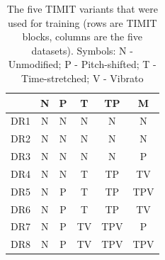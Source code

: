 \begin{table}
 \begin{center}
  \begin{tabular}{|c||c|c|c|c|c|}
  \hline
   & \textbf{N} & \textbf{P} &\textbf{T} &\textbf{TP} &\textbf{M} \\
  \hline
  DR1 & N & N & N & N & N  \\
  DR2 & N & N & N & N & N \\
  DR3 & N & N & N & N & P\\
  DR4 & N & N & T & TP & TV \\
  DR5 & N & P & T & TP & TPV \\
  DR6 & N & P & T & TP & TV \\
  DR7 & N & P & TV & TPV & P \\
  DR8 & N & P & TV & TPV & TPV \\
  \hline
 \end{tabular}
\end{center}
 \caption{The five TIMIT variants that were used for training (rows are TIMIT blocks, columns are the five datasets).
  Symbols: N - Unmodified; P - Pitch-shifted; T - Time-stretched; V - Vibrato}
 \label{tab:timit_variants}
\end{table}


